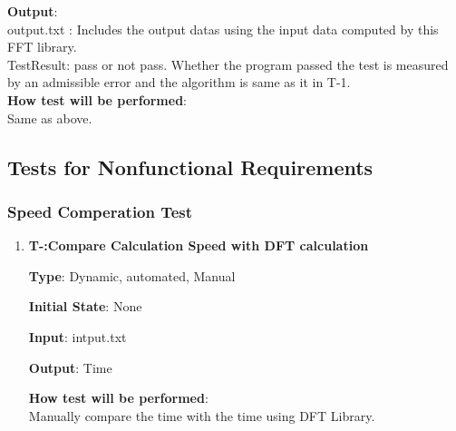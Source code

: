 \documentclass[12pt, titlepage]{article}
\newcounter{tnum}
\begin{document}
\begin{enumerate}
\textbf {Output}: \\{\large output.txt} : Includes the output datas using the input data computed by this FFT library.\\
{\large TestResult}: pass or not pass. Whether the program passed the test is measured by an admissible error and the algorithm is same as it in T-1.\\

\textbf {How test will be performed}: \\
Same as above.


\end{enumerate}
\subsection{Tests for Nonfunctional Requirements}

\subsubsection{Speed Comperation  Test}
\begin{enumerate}

\item{\textbf{T-\thetnum \label{R3RIFFT}:Compare Calculation Speed with DFT calculation}}

\textbf {Type}: Dynamic, automated, Manual
					
\textbf {Initial State}: None
					
\textbf {Input}: intput.txt 
					
\textbf {Output}: Time
					
\textbf {How test will be performed}: \\
Manually compare the time with the time using DFT Library.

\end{enumerate}
\end{document}
